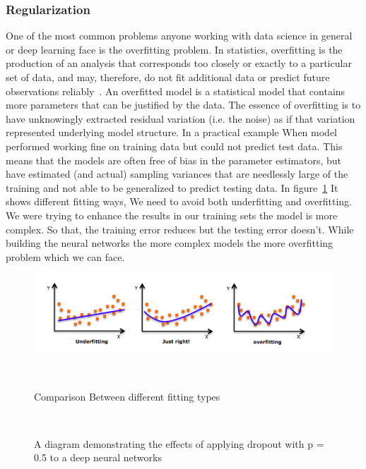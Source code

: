 \subsubsection{Regularization}

One of the most common problems anyone working with data science in general or deep learning face is the overfitting problem. In statistics, overfitting is the production of an analysis that corresponds too closely or exactly to a particular set of data, and may, therefore, do not fit additional data or predict future observations reliably~\cite{Wiki_Overfitting}. An overfitted model is a statistical model that contains more parameters that can be justified by the data. The essence of overfitting is to have unknowingly extracted residual variation (i.e. the noise) as if that variation represented underlying model structure. In a practical example When model performed working fine on training data but could not predict test data. This means that the models are often free of bias in the parameter estimators, but have estimated (and actual) sampling variances that are needlessly large  of the training and not able to be generalized to predict testing data. In figure~\ref{Fig:Fitting} It shows different fitting ways, We need to avoid both underfitting and overfitting. We were trying to enhance the results in our training sets the model is more complex. So that, the training error reduces but the testing error doesn’t. While building the neural networks the more complex models the more overfitting problem which we can face.

\begin{figure}[!t]
  \centering
  \includegraphics[scale=0.6]{./Figures/Ch_2_Background/Fig_Fitting.png}
        \caption{Comparison Between different fitting types}~\label{Fig:Fitting}
      \end{figure}%

\begin{figure}[!t]
  \centering

        \caption{A diagram demonstrating the effects of applying dropout with p = 0.5 to a deep neural networks~\cite{Gitrepo_NN_Tikz}}~\label{Fig:NN_Dropout}
      \end{figure}


